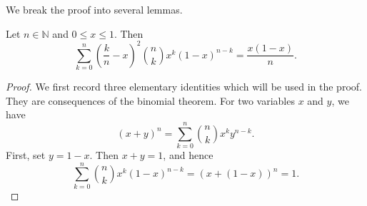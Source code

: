 We break the proof into several lemmas. 

\begin{lemma} \label{lm: 1121}
    Let \(n \in \mathbb{N}\) and \(0 \le x \le 1\). Then 
    \[
        \sum_{k=0}^n \left( \frac{k}{n} - x \right)^2 \binom{n}{k} x^k (1 - x)^{n - k} = \frac{x(1 - x)}{n}.  
    \]  
\end{lemma}

\begin{proof}
    We first record three elementary identities which will be used in the proof. They are consequences of the binomial theorem. For two variables \(x\) and \(y\), we have 
    \[
        (x + y)^n = \sum_{k=0}^n \binom{n}{k} x^k y^{n - k}. 
    \]  
    First, set \(y = 1 - x\). Then \(x + y = 1\), and hence 
    \[
        \sum_{k=0}^n \binom{n}{k} x^k (1 - x)^{n - k} = (x + (1 - x))^n = 1. 
    \]  


\end{proof}

